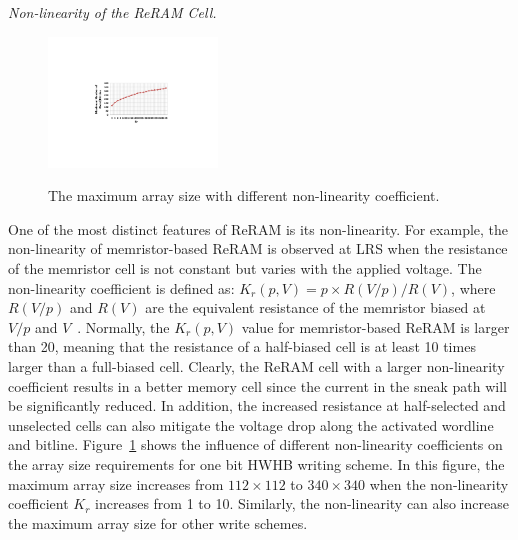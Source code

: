 \vspace{6pt} \emph{Non-linearity of the ReRAM Cell.} \vspace{6pt}

\begin{figure}[!b]
\centering
  \includegraphics[width=0.4\textwidth]{./figures/non_linear}\\
  \caption{The maximum array size with different non-linearity coefficient.}\label{fig:non_linear}
\end{figure}
One of the most distinct features of ReRAM is its non-linearity. For example, the non-linearity of memristor-based ReRAM is observed at LRS when the resistance of the memristor cell is not constant but varies with the applied voltage. The non-linearity coefficient is defined as:
$K_r(p,V) = p \times R(V/p)/R(V)$, where $R(V/p)$ and $R(V)$ are the equivalent resistance of the memristor biased at $V/p$ and $V$~\cite{memristor:Cong}. Normally, the $K_r(p,V)$ value for memristor-based ReRAM is larger than 20, meaning that the resistance of a half-biased  cell is at least 10 times larger than a full-biased cell. Clearly, the ReRAM cell with a larger non-linearity coefficient results in a better memory cell since the current in the sneak path will be significantly reduced. In addition, the increased resistance at half-selected and unselected cells can also mitigate the voltage drop along the activated wordline and bitline. Figure~\ref{fig:non_linear} shows the influence of different non-linearity coefficients on the array size requirements for one bit HWHB writing scheme. In this figure, the maximum array size increases from $112 \times 112$ to $340 \times 340$ when the non-linearity coefficient $K_r$ increases from 1 to 10. Similarly, the non-linearity can also increase the maximum array size for other write schemes.


